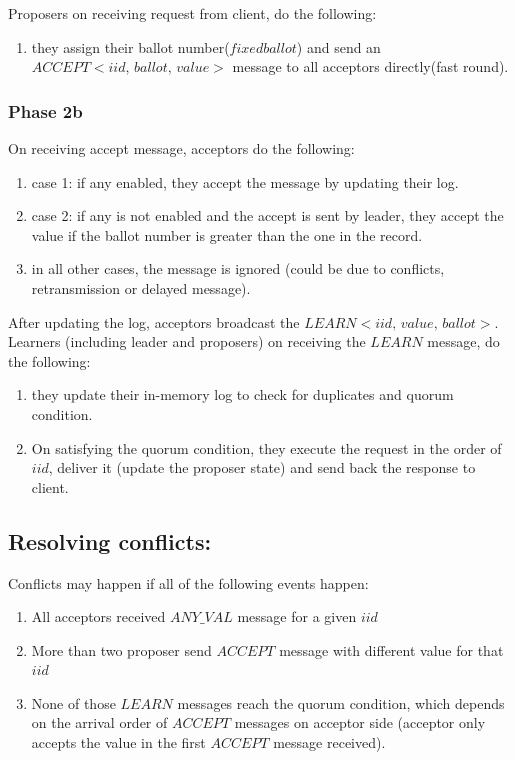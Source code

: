 \noindent
Proposers on receiving request from client, do the following:
\begin{enumerate}
\item they assign their ballot number($fixed ballot$) and send an $ACCEPT<iid, \, ballot, \, value>$ message to all acceptors directly(fast round).
\end{enumerate}

\subsubsection{Phase 2b}
\noindent
On receiving accept message, acceptors do the following:
\begin{enumerate}
\item case 1: if any enabled, they accept the message by updating their log.
\item case 2: if any is not enabled and the accept is sent by leader, they accept the value if the ballot number is greater than the one in the record.
\item in all other cases, the message is ignored (could be due to conflicts, retransmission or delayed message).
\end{enumerate}

After updating the log, acceptors broadcast the $LEARN<iid, \, value, \, ballot>$. \\
\noindent
Learners (including leader and proposers) on receiving the $LEARN$ message, do the following:
\begin{enumerate}
\item they update their in-memory log to check for duplicates and quorum condition.
\item On satisfying the quorum condition, they execute the request in the order of $iid$, deliver it (update the proposer state) and send back the response to client.
\end{enumerate}


\subsection{Resolving conflicts:}
Conflicts may happen if all of the following events happen:

\begin{enumerate}
\item All acceptors received $ANY\_VAL$ message for a given $iid$
\item More than two proposer send $ACCEPT$ message with different value for that $iid$
\item None of those $LEARN$ messages reach the quorum condition, which depends on the arrival order of $ACCEPT$ messages on acceptor side (acceptor only accepts the value in the first $ACCEPT$ message received). 
\end{enumerate}

